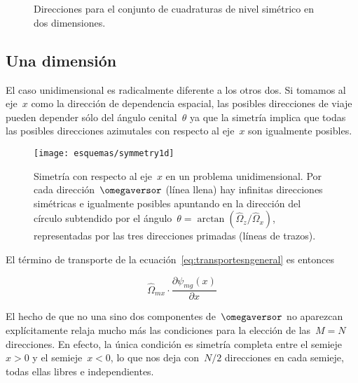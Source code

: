 \begin{figure}
 \begin{center}
  \\
  \\
 \end{center}
\caption{\label{fig:direcciones2d}Direcciones para el conjunto de cuadraturas de nivel simétrico en dos dimensiones.}
\end{figure}



\subsection{Una dimensión} %

El caso unidimensional es radicalmente diferente a los otros dos. Si tomamos al eje~$x$ como la dirección de dependencia espacial, las posibles direcciones de viaje pueden depender sólo del ángulo cenital~$\theta$ ya que la simetría implica que todas las posibles direcciones azimutales con respecto al eje~$x$ son igualmente posibles.

\begin{figure}
 \begin{center}
  \texttt{[image: esquemas/symmetry1d]}
 \end{center}
\caption{\label{fig:symmetry1d}Simetría con respecto al eje~$x$ en un problema unidimensional. Por cada dirección~$\omegaversor$ (línea llena) hay infinitas direcciones simétricas e igualmente posibles apuntando en la dirección del círculo subtendido por el ángulo~$\theta=\arctan(\hat{\Omega}_z/\hat{\Omega}_x)$, representadas por las tres direcciones primadas (líneas de trazos).}
\end{figure}

El término de transporte de la ecuación~\eqref{eq:transportesngeneral} es entonces

\begin{equation*}
 \hat{\Omega}_{mx} \cdot \frac{\partial{\psi_{mg}}(x)}{\partial x} 
\end{equation*}

El hecho de que no una sino dos componentes de~$\omegaversor$ no aparezcan explícitamente relaja mucho más las condiciones para la elección de las~$M=N$ direcciones. En efecto, la única condición es simetría completa entre el semieje~$x>0$ y el semieje~$x<0$, lo que nos deja con~$N/2$ direcciones en cada semieje, todas ellas libres e independientes.

